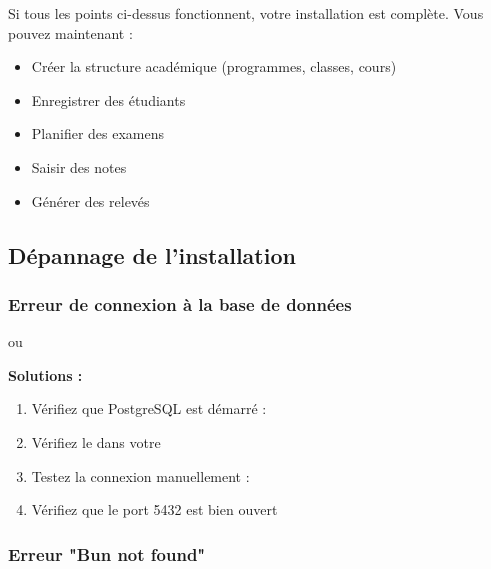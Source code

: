 \begin{tcolorbox}[colback=green!5!white,colframe=green!75!black,title=Installation réussie !]
Si tous les points ci-dessus fonctionnent, votre installation est complète. Vous pouvez maintenant :
\begin{itemize}[leftmargin=*]
    \item Créer la structure académique (programmes, classes, cours)
    \item Enregistrer des étudiants
    \item Planifier des examens
    \item Saisir des notes
    \item Générer des relevés
\end{itemize}
\end{tcolorbox}

\subsection{Dépannage de l'installation}

\subsubsection{Erreur de connexion à la base de données}

\begin{tcolorbox}[colback=red!5!white,colframe=red!75!black,title=Symptôme]
 ou 
\end{tcolorbox}

\textbf{Solutions :}
\begin{enumerate}[leftmargin=*]
    \item Vérifiez que PostgreSQL est démarré : 
    \item Vérifiez le  dans votre 
    \item Testez la connexion manuellement : 
    \item Vérifiez que le port 5432 est bien ouvert
\end{enumerate}

\subsubsection{Erreur "Bun not found"}

\begin{tcolorbox}[colback=red!5!white,colframe=red!75!black,title=Symptôme]
\end{tcolorbox}

